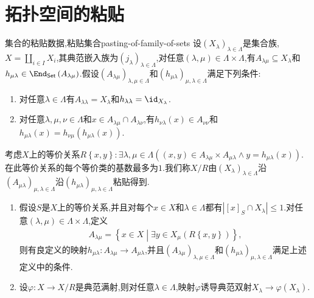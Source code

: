 \section{拓扑空间的粘贴}

\begin{definition}{集合的粘贴数据,粘贴集合}{pasting-of-family-of-sets}
	设$\left(X_{\lambda}\right)_{\lambda\in\Lambda}$是集合族,$X=\coprod\limits_{i\in I}X_{i}$,其典范嵌入族为$\left(j_{\lambda}\right)_{\lambda\in\Lambda}$,对任意$\left(\lambda,\mu\right)\in\Lambda\times\Lambda$,有$A_{\lambda\mu}\subseteq X_{\lambda}$和$h_{\mu\lambda}\in\End_{\mathsf{Set}}\left(A_{\lambda\mu}\right)$.假设$\left(A_{\lambda\mu}\right)_{\lambda,\mu\in\Lambda}$和$\left(h_{\mu\lambda}\right)_{\mu,\lambda\in\Lambda}$满足下列条件:
	\begin{enumerate}
		\item 对任意$\lambda\in\Lambda$有$A_{\lambda\lambda}=X_{\lambda}$和$h_{\lambda\lambda}=\id_{X_{\lambda}}$.
		\item 对任意$\lambda,\mu,\nu\in\Lambda$和$x\in A_{\lambda\mu}\cap A_{\lambda\nu}$,有$h_{\nu\lambda}\left(x\right)\in A_{\nu\nu}$和$h_{\mu\lambda}\left(x\right)=h_{\nu\mu}\left(h_{\mu\lambda}\left(x\right)\right)$.
	\end{enumerate}
	考虑$X$上的等价关系$R\left\{x,y\right\}:\exists\lambda,\mu\in\Lambda\left(\left(x,y\right)\in A_{\lambda\mu}\times A_{\mu\lambda}\wedge y=h_{\mu\lambda}\left(x\right)\right)$.在此等价关系的每个等价类的基数最多为$1$.我们称$X/R$由$\left(X_{\lambda}\right)_{\lambda\in\Lambda}$沿$\left(A_{\mu\lambda}\right)_{\mu,\lambda\in\Lambda}$沿$\left(h_{\mu\lambda}\right)_{\mu,\lambda\in\Lambda}$粘贴得到.
\end{definition}

\begin{remark}{}{}
	\begin{enumerate}
		\item 假设$S$是$X$上的等价关系,并且对每个$x\in X$和$\lambda\in\Lambda$都有$\left|\left[x\right]_{S}\cap X_{\lambda}\right|\leq 1$.对任意$\left(\lambda,\mu\right)\in\Lambda\times\Lambda$,定义
		\begin{align*}
			A_{\lambda\mu}=\left\{x\in X\middle|\exists y\in X_{\mu}\left(R\left\{x,y\right\}\right)\right\},
		\end{align*}
		则有良定义的映射$h_{\mu\lambda}:A_{\lambda\mu}\to A_{\mu\lambda}$,并且$\left(A_{\lambda\mu}\right)_{\lambda,\mu\in\Lambda}$和$\left(h_{\mu\lambda}\right)_{\mu,\lambda\in\Lambda}$满足上述定义中的条件.
		\item 设$\varphi:X\to X/R$是典范满射,则对任意$\lambda\in\Lambda$,映射$\varphi$诱导典范双射$X_{\lambda}\to\varphi\left(X_{\lambda}\right)$.
	\end{enumerate}
\end{remark}

